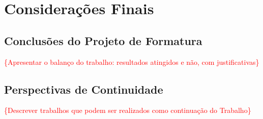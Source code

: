 \chapter{Considerações Finais}


\section{Conclusões do Projeto de Formatura}
\textcolor{red}{\{Apresentar o balanço do trabalho: resultados atingidos e não, com justificativas\}}


\section{Perspectivas de Continuidade}
\textcolor{red}{\{Descrever trabalhos que podem ser realizados como continuação do Trabalho\}}

